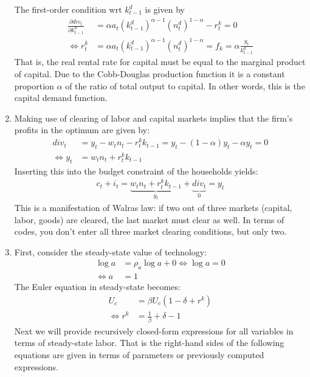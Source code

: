 \begin{enumerate}
The first-order condition wrt \(k^{d}_{t-1}\) is given by
\begin{align*}
\frac{\partial {div}_t}{\partial k^{d}_{t-1}} &= \alpha a_t {(k^{d}_{t-1})}^{\alpha-1} {(n^{d}_{t})}^{1-\alpha} - r^{k}_{t} = 0
\\
\Leftrightarrow r^{k}_{t} &= \alpha a_t {(k^{d}_{t-1})}^{\alpha-1} {(n^{d}_{t})}^{1-\alpha} = f_k = \alpha \frac{y_t}{k^{d}_{t-1}}
\end{align*}
That is, the real rental rate for capital must be equal to the marginal product of capital.
Due to the Cobb-Douglas production function it is a constant proportion \(\alpha \) of the ratio of total output to capital.
In other words, this is the capital demand function.

\item
Making use of clearing of labor and capital markets implies that the firm's profits in the optimum are given by:
\begin{align*}
{div}_t &= y_t - w_t n_{t} - r^{k}_{t} k_{t-1} = y_t - (1-\alpha)y_t - \alpha y_t = 0
\\
\Leftrightarrow y_t &= w_t n_{t} + r^{k}_{t} k_{t-1}
\end{align*}
Inserting this into the budget constraint of the households yields:
\begin{align*}
c_t + i_t = \underbrace{w_t n_{t} + r^{k}_{t} k_{t-1}}_{y_{t}} + \underbrace{{div}_t}_{0} = y_t
\end{align*}
This is a manifestation of Walras law:
  if two out of three markets (capital, labor, goods) are cleared, the last market must clear as well.
In terms of codes, you don't enter all three market clearing conditions, but only two.

\item
First, consider the steady-state value of technology:
\begin{align*}
\log{a}&=\rho_a \log{a} + 0 \Leftrightarrow \log{a} = 0
\\
\Leftrightarrow a &= 1 
\end{align*}
The Euler equation in steady-state becomes:
\begin{align*}
U_c &= \beta U_c (1-\delta+r^{k})
\\
\Leftrightarrow r^{k} &= \frac{1}{\beta} + \delta - 1
\end{align*}
Next we will provide recursively closed-form expressions for all variables in terms of steady-state labor.
That is the right-hand sides of the following equations are given in terms of parameters or previously computed expressions.


\end{enumerate}
